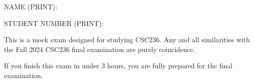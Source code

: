 \documentclass{article}
\begin{document}
    {\Large NAME (PRINT): \enspace\hrulefill}

    \bigskip

    {\Large STUDENT NUMBER (PRINT): \enspace\hrulefill}

    \bigskip

    \begin{center}
    \end{center}

    This is a mock exam designed for studying CSC236. Any and all similarities with the Fall 2024 CSC236 final examination are purely coincidence.

    If you finish this exam in under 3 hours, you are fully prepared for the final examination.



    \newpage
\end{document}
